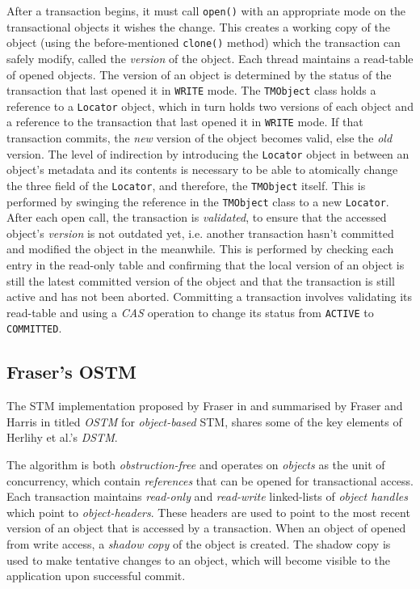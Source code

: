 After a transaction begins, it must call \texttt{open()} with an appropriate mode on the transactional objects it wishes the change. This creates a working copy of the object (using the before-mentioned \texttt{clone()} method) which the transaction can safely modify, called the \textit{version} of the object. Each thread maintains a read-table of opened objects. The version of an object is determined by the status of the transaction that last opened it in \texttt{WRITE} mode. The \texttt{TMObject} class holds a reference to a \texttt{Locator} object, which in turn holds two versions of each object and a reference to the transaction that last opened it in \texttt{WRITE} mode. If that transaction commits, the \textit{new} version of the object becomes valid, else the \textit{old} version. The level of indirection by introducing the \texttt{Locator} object in between an object's metadata and its contents is necessary to be able to atomically change the three field of the \texttt{Locator}, and therefore, the \texttt{TMObject} itself. This is performed by swinging the reference in the \texttt{TMObject} class to a new \texttt{Locator}\cite{DSTM}. After each open call, the transaction is \textit{validated}, to ensure that the accessed object's \textit{version} is not outdated yet, i.e. another transaction hasn't committed and modified the object in the meanwhile. This is performed by checking each entry in the read-only table and confirming that the local version of an object is still the latest committed version of the object and that the transaction is still active and has not been aborted\cite{DSTM}. Committing a transaction involves validating its read-table and using a \textit{CAS} operation to change its status from \texttt{ACTIVE} to \texttt{COMMITTED}\cite{DSTM}.

\subsection{Fraser's OSTM}
The STM implementation proposed by Fraser in \cite{OSTM} and summarised by Fraser and Harris in \cite{ostm2} titled \textit{OSTM} for \textit{object-based} STM, shares some of the key elements of Herlihy et al.'s \textit{DSTM}\cite{DSTM}. 

The algorithm is both \textit{obstruction-free} and operates on \textit{objects} as the unit of concurrency, which contain \textit{references} that can be opened for transactional access\cite{OSTM}. Each transaction maintains \textit{read-only} and \textit{read-write} linked-lists of \textit{object handles} which point to \textit{object-headers}. These headers are used to point to the most recent version of an object that is accessed by a transaction. When an object of opened from write access, a \textit{shadow copy} of the object is created. The shadow copy is used to make tentative changes to an object, which will become visible to the application upon successful commit\cite{OSTM}.

